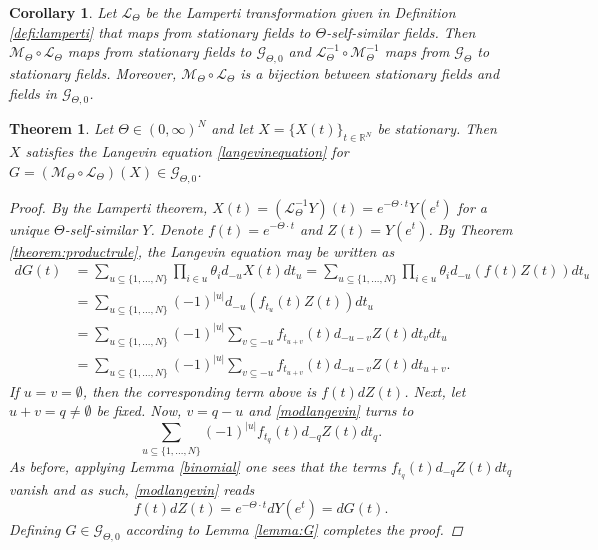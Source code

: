 \documentclass[english, a4paper, 12pt,reqno]{amsart}
\newtheorem{theorem}[defi]{Theorem}
\newtheorem{kor}[defi]{Corollary}
\begin{document}
\begin{kor}
\label{cor:bijection}
Let $\mathcal{L}_\Theta$ be the Lamperti transformation  given in Definition \ref{defi:lamperti} that maps from stationary fields to $\Theta$-self-similar fields. Then $\mathcal{M}_\Theta \circ \mathcal{L}_\Theta$ maps from stationary fields to $\mathcal{G}_{\Theta,0}$ and $\mathcal{L}_\Theta^{-1} \circ \mathcal{M}_\Theta^{-1}$ maps from $\mathcal{G}_\Theta$ to stationary fields. Moreover, $\mathcal{M}_\Theta \circ \mathcal{L}_\Theta$ is a bijection between stationary fields and fields in $\mathcal{G}_{\Theta,0}$.
\end{kor}

\begin{theorem}
\label{theorem:1}
Let $\Theta \in(0, \infty)^{N}$ and let $X = \{X(t)\}_{t\in\mathbb{R}^N}$ be stationary. Then $X$ satisfies the Langevin equation \eqref{langevinequation} for $G = ( \mathcal{M}_\Theta \circ \mathcal{L}_\Theta)(X)\in\mathcal{G}_{\Theta,0}$.

\begin{proof}
By the Lamperti theorem, $X(t)=(\mathcal{L}_\Theta^{-1} Y)(t) = e^{-\Theta \cdot t} Y(e^{t})$ for a unique $\Theta$-self-similar $Y$. Denote $f(t)=e^{-\Theta \cdot t}$ and $Z(t)=Y(e^{t})$. By Theorem \ref{theorem:productrule}, the Langevin equation may be written as 
\begin{equation}
\label{modlangevin}
\begin{split}
dG(t) &= \sum_{u\subseteq\{1,\dots,N\}} \prod _{i\in u}\theta_i d_{-u}X(t) dt_u =\sum_{u\subseteq\{1,\dots,N\}} \prod _{i\in u}\theta_i d_{-u}(f(t)Z(t)) dt_u \\
&= \sum_{u\subseteq\{1,\dots,N\}} (-1)^{|u|}d_{-u}(f_{t_u}(t)Z(t)) dt_u\\
&= \sum_{u\subseteq\{1,\dots,N\}} (-1)^{|u|}\sum_{v \subseteq -u}f_{t_{u+v}}(t)d_{-u-v}Z(t) dt_vdt_u\\
&= \sum_{u\subseteq\{1,\dots,N\}} (-1)^{|u|}\sum_{v \subseteq -u}f_{t_{u+v}}(t)d_{-u-v}Z(t) dt_{u+v}.
\end{split}
\end{equation}
If $u=v=\emptyset$, then the corresponding term above is $f(t)dZ(t)$. Next, let $u+v = q \neq \emptyset$ be fixed. Now, $v = q-u$ and \eqref{modlangevin} turns to
\begin{equation}
\label{fixedsum}
\sum_{u\subseteq\{1,\dots,N\}} (-1)^{|u|}f_{t_{q}}(t)d_{-q}Z(t) dt_{q}.
\end{equation}
As before, applying Lemma \ref{binomial} one sees that the terms $f_{t_{q}}(t)d_{-q}Z(t) dt_{q}$ vanish and as such,  \eqref{modlangevin} reads
\begin{equation*}
f(t) d Z(t) =e^{-\Theta \cdot t} dY(e^{t}) = dG(t). 
\end{equation*}
Defining $G\in\mathcal{G}_{\Theta,0}$ according to Lemma \ref{lemma:G} completes the proof.
\end{proof}
\end{theorem}
\end{document}
